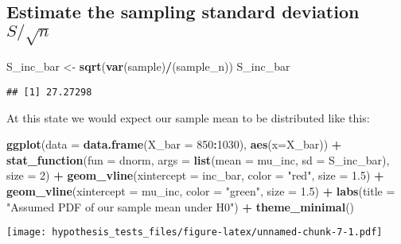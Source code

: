 \documentclass[]{article}
\newenvironment{Shaded}{\begin{snugshade}}{\end{snugshade}}
\newcommand{\KeywordTok}[1]{\textcolor[rgb]{0.13,0.29,0.53}{\textbf{#1}}}
\newcommand{\DataTypeTok}[1]{\textcolor[rgb]{0.13,0.29,0.53}{#1}}
\newcommand{\DecValTok}[1]{\textcolor[rgb]{0.00,0.00,0.81}{#1}}
\newcommand{\FloatTok}[1]{\textcolor[rgb]{0.00,0.00,0.81}{#1}}
\newcommand{\StringTok}[1]{\textcolor[rgb]{0.31,0.60,0.02}{#1}}
\newcommand{\OperatorTok}[1]{\textcolor[rgb]{0.81,0.36,0.00}{\textbf{#1}}}
\newcommand{\NormalTok}[1]{#1}
\begin{document}
\subsection{\texorpdfstring{Estimate the sampling standard deviation
\(S / \sqrt{n}\)}{Estimate the sampling standard deviation S / \textbackslash{}sqrt\{n\}}}\label{estimate-the-sampling-standard-deviation-s-sqrtn}

\begin{Shaded}
\begin{Highlighting}[]
\NormalTok{S_inc_bar <-}\StringTok{ }\KeywordTok{sqrt}\NormalTok{(}\KeywordTok{var}\NormalTok{(sample)}\OperatorTok{/}\NormalTok{(sample_n))}
\NormalTok{S_inc_bar}
\end{Highlighting}
\end{Shaded}

\begin{verbatim}
## [1] 27.27298
\end{verbatim}

At this state we would expect our sample mean to be distributed like
this:

\begin{Shaded}
\begin{Highlighting}[]
\KeywordTok{ggplot}\NormalTok{(}\DataTypeTok{data =}  \KeywordTok{data.frame}\NormalTok{(}\DataTypeTok{X_bar =} \DecValTok{850}\OperatorTok{:}\DecValTok{1030}\NormalTok{), }\KeywordTok{aes}\NormalTok{(}\DataTypeTok{x=}\NormalTok{X_bar)) }\OperatorTok{+}
\StringTok{  }\KeywordTok{stat_function}\NormalTok{(}\DataTypeTok{fun =}\NormalTok{ dnorm, }\DataTypeTok{args =} \KeywordTok{list}\NormalTok{(}\DataTypeTok{mean =}\NormalTok{ mu_inc, }\DataTypeTok{sd =}\NormalTok{ S_inc_bar), }\DataTypeTok{size =} \DecValTok{2}\NormalTok{) }\OperatorTok{+}
\StringTok{  }\KeywordTok{geom_vline}\NormalTok{(}\DataTypeTok{xintercept =}\NormalTok{ inc_bar, }\DataTypeTok{color =} \StringTok{"red"}\NormalTok{, }\DataTypeTok{size =} \FloatTok{1.5}\NormalTok{) }\OperatorTok{+}
\StringTok{  }\KeywordTok{geom_vline}\NormalTok{(}\DataTypeTok{xintercept =}\NormalTok{ mu_inc, }\DataTypeTok{color =} \StringTok{"green"}\NormalTok{, }\DataTypeTok{size =} \FloatTok{1.5}\NormalTok{) }\OperatorTok{+}
\StringTok{  }\KeywordTok{labs}\NormalTok{(}\DataTypeTok{title =} \StringTok{"Assumed PDF of our sample mean under H0"}\NormalTok{) }\OperatorTok{+}
\StringTok{  }\KeywordTok{theme_minimal}\NormalTok{()}
\end{Highlighting}
\end{Shaded}

\texttt{[image: hypothesis\_tests\_files/figure-latex/unnamed-chunk-7-1.pdf]}
\end{document}
